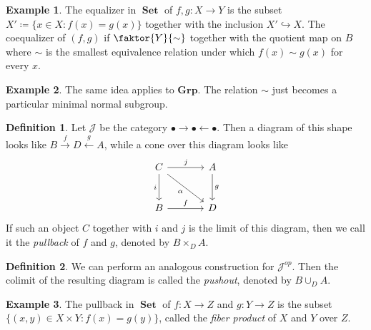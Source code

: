 \documentclass[10pt,letterpaper,cm]{nupset}
\theoremstyle{definition}
\newtheorem*{definition}{Definition}
\newtheorem{exmp}{Example}
\newcommand{\1}{\mathbf{1}}
\renewcommand{\j}{\mathscr{J}}
\newcommand{\0}{\vec 0}
\DeclareMathOperator{\set}{\mathbf{Set}}
\begin{document}
\begin{exmp}
The equalizer in $\set$ of $f, g: X \to Y$ is the subset $X'\coloneqq \{x \in X : f(x) = g(x)\}$ together with the inclusion $X' \hookrightarrow X$. The coequalizer of $(f, g)$ if $\faktor{Y}{\sim}$ together with the quotient map on $B$ where $\sim$ is the smallest equivalence relation under which $f(x) \sim g(x)$ for every $x$.
\end{exmp}

\begin{exmp}
The same idea applies to $\mathbf{Grp}$. The relation $\sim$ just becomes a particular minimal normal subgroup.
\end{exmp}

\begin{definition}
Let $\j$ be the category $\bullet \rightarrow \bullet \leftarrow \bullet$. Then a diagram of this shape looks like $B \overset{f}{\longrightarrow} D \overset{g}{\longleftarrow} A$, while a cone over this diagram looks like 
\[
\begin{tikzcd}[row sep=large, column sep=large]
C \arrow[to=Z, "i ", swap] \arrow[to=2-2, dr, "\alpha", swap]
& A \arrow[to=2-2, "g "] \\
|[alias=Z]| B  \arrow[to=2-2, "f"] 
& D
\arrow[from=ul, to=1-2, "j "]
\end{tikzcd}
\]
If such an object $C$ together with $i$ and $j$ is the limit of this diagram, then we call it the \textit{pullback} of $f$ and $g$, denoted by $B \times_{D} A$.
\end{definition}

\begin{definition}
We can perform an analogous construction for $\j^{op}$. Then the colimit of the resulting diagram is called the \textit{pushout}, denoted by $B \cup_{D} A$.
\end{definition}

\begin{exmp}
The pullback in $\set$ of $f: X \to Z$ and $g: Y \to Z$ is the subset $\{(x,y) \in X \times Y : f(x) = g(y)\}$, called the \textit{fiber product} of $X$ and $Y$ over $Z$.
\end{exmp}
\end{document}
